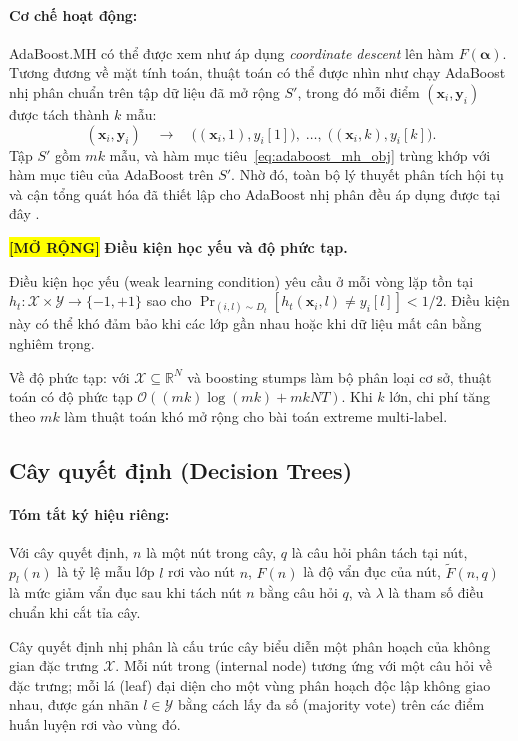 \paragraph{Cơ chế hoạt động:}
AdaBoost.MH có thể được xem như áp dụng \textit{coordinate descent} lên hàm $F(\bm{\alpha})$. Tương đương về mặt tính toán, thuật toán có thể được nhìn như chạy AdaBoost nhị phân chuẩn trên tập dữ liệu đã mở rộng $S'$, trong đó mỗi điểm $(\bm{x}_i,\bm{y}_i)$ được tách thành $k$ mẫu:
\[
  (\bm{x}_i,\bm{y}_i)
  \quad\longrightarrow\quad
  \bigl((\bm{x}_i,1),y_i[1]\bigr),\;\ldots,\;
  \bigl((\bm{x}_i,k),y_i[k]\bigr).
\]
Tập $S'$ gồm $mk$ mẫu, và hàm mục tiêu~\eqref{eq:adaboost_mh_obj} trùng khớp với hàm mục tiêu của AdaBoost trên $S'$. Nhờ đó, toàn bộ lý thuyết phân tích hội tụ và cận tổng quát hóa đã thiết lập cho AdaBoost nhị phân đều áp dụng được tại đây \cite{mohri2018foundations}.

\medskip
\noindent\colorbox{yellow}{\textbf{[MỞ RỘNG]}} \textbf{Điều kiện học yếu và độ phức tạp.}

Điều kiện học yếu (weak learning condition) yêu cầu ở mỗi vòng lặp tồn tại $h_t: \mathcal{X}\times\mathcal{Y}\to\{-1,+1\}$ sao cho $\Pr_{(i,l)\sim D_t}[h_t(\bm{x}_i,l)\neq y_i[l]] < 1/2$. Điều kiện này có thể khó đảm bảo khi các lớp gần nhau hoặc khi dữ liệu mất cân bằng nghiêm trọng.

Về độ phức tạp: với $\mathcal{X}\subseteq\mathbb{R}^N$ và boosting stumps làm bộ phân loại cơ sở, thuật toán có độ phức tạp $\mathcal{O}((mk)\log(mk) + mkNT)$. Khi $k$ lớn, chi phí tăng theo $mk$ làm thuật toán khó mở rộng cho bài toán extreme multi-label.

\subsection{Cây quyết định (Decision Trees)}
\label{sssec:decision_trees}

\paragraph{Tóm tắt ký hiệu riêng:}
Với cây quyết định, $n$ là một nút trong cây, $q$ là câu hỏi phân tách tại nút, $p_l(n)$ là tỷ lệ mẫu lớp $l$ rơi vào nút $n$, $F(n)$ là độ vẩn đục của nút, $\widetilde{F}(n,q)$ là mức giảm vẩn đục sau khi tách nút $n$ bằng câu hỏi $q$, và $\lambda$ là tham số điều chuẩn khi cắt tỉa cây.

Cây quyết định nhị phân là cấu trúc cây biểu diễn một phân hoạch của không gian đặc trưng $\mathcal{X}$. Mỗi nút trong (internal node) tương ứng với một câu hỏi về đặc trưng; mỗi lá (leaf) đại diện cho một vùng phân hoạch độc lập không giao nhau, được gán nhãn $l\in\mathcal{Y}$ bằng cách lấy đa số (majority vote) trên các điểm huấn luyện rơi vào vùng đó.

